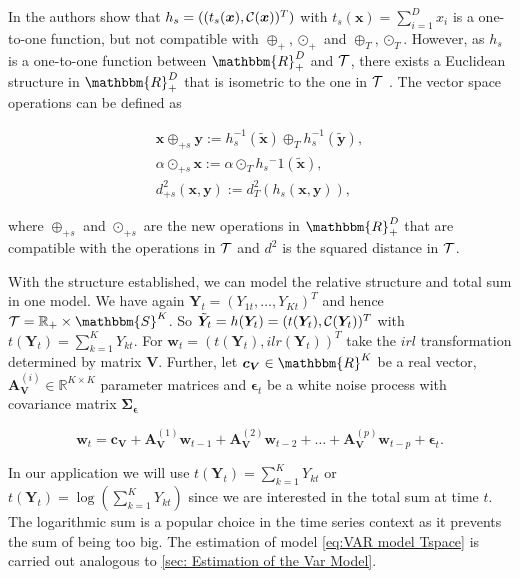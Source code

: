 In \cite{Pawlowsky:2013} the authors show that $h_s=((t_s(\bm{x}),\mathcal{C}(\bm{x}))^T)$ with $t_s(\bm{x}) = \sum_{i=1}^D x_i$ is a one-to-one function, but not compatible with $\oplus_+,\odot_+$ and $\oplus_T,\odot_T$. However, as $h_s$ is a one-to-one function between $\mathbbm{R}_+^D$ and $\mathcal{T}$, there exists a Euclidean structure in $\mathbbm{R}_+^D$ that is isometric to the one in $\mathcal{T}$ \cite{Pawlowsky:2013}. The vector space operations can be defined as

\begin{gather}
\bm{x} \oplus_{+s} \bm{y} := h_s^{-1}(\tilde{\bm{x}}) \oplus_T  h_s^{-1}(\tilde{\bm{y}}), \\
\alpha \odot_{+s} \bm{x} := \alpha \odot_T h_s{^-1}(\tilde{\bm{x}}), \\
d_{+s}^2(\bm{x},\bm{y}) := d_T^2(h_s(\bm{x},\bm{y})),
\label{eq:Vector Space Operations sum}
\end{gather}

where $\oplus_{+s}$ and $\odot_{+s}$ are the new operations in $\mathbbm{R}_+^D$ that are compatible with the operations in $\mathcal{T}$ and $d^2$ is the squared distance in $\mathcal{T}$. 

With the structure established, we can model the relative structure and total sum in one model.  We have again $\bm{Y}_t=(Y_{1t},\ldots,Y_{Kt})^T$ and hence $\Tsp = \mathbb{R}_+ \times \mathbbm{S}^K$. So $\tilde{\bm{Y}}_t=h(\bm{Y}_t)=(t(\bm{Y}_t),\mathcal{C}(\bm{Y}_t))^T$ with $t(\bm{Y}_t)=\sum_{k=1}^K Y_{kt}$. For $\bm{w}_t =(t(\bm{Y}_t),ilr(\bm{Y}_t))^T$ take the $irl$ transformation determined by matrix $\bm{V}$. Further, let $\bm{c}_{\bm{V}} \in \mathbbm{R}^K$ be a real vector, $\textbf{A}_{\textbf{V}}^{(i)} \in \mathbb{R}^{K \times K}$ parameter matrices and $\bm{\epsilon}_t$ be a white noise process with covariance matrix $\bm{\Sigma_\epsilon}$

\begin{equation}
\textbf{w}_t = \textbf{c}_{\textbf{V}} + \textbf{A}_{\textbf{V}}^{(1)}\textbf{w}_{t-1} + \textbf{A}_{\textbf{V}}^{(2)}\textbf{w}_{t-2} + \ldots + \textbf{A}_{\textbf{V}}^{(p)}\textbf{w}_{t-p} + \bm{\epsilon}_{t}.
\label{eq:VAR model Tspace}
\end{equation}

In our application we will use $t(\bm{Y}_t)=\sum_{k=1}^K Y_{kt}$ or $t(\bm{Y}_t)=\log(\sum_{k=1}^K Y_{kt})$ since we are interested in the total sum at time $t$. The logarithmic sum is a popular choice in the time series context as it prevents the sum of being too big\cite{Kynclova:2015}. The estimation of model \ref{eq:VAR model Tspace} is carried out analogous to \ref{sec: Estimation of the Var Model}. 

